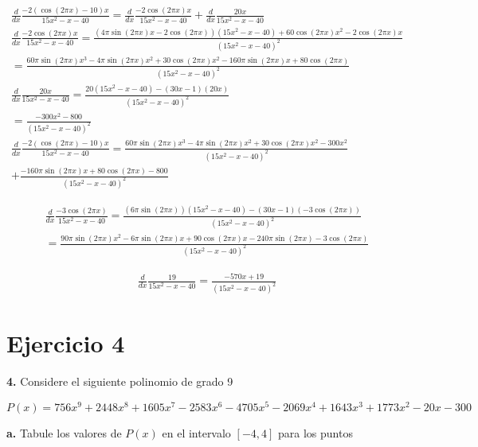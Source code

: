 \documentclass{article} %
\begin{document}
\begin{gather*}
    \frac{d}{dx} \frac{-2(\cos{(2\pi x)}-10)x}{15x^2-x-40} = \frac{d}{dx} \frac{-2\cos{(2\pi x)}x}{15x^2-x-40} + \frac{d}{dx} \frac{20x}{15x^2-x-40}\\
    \frac{d}{dx} \frac{-2\cos{(2\pi x)}x}{15x^2-x-40} = \frac{(4\pi \sin{(2\pi x)}x-2\cos{(2\pi x)})(15x^2 -x-40)+60\cos{(2\pi x)}x^2-2\cos{(2\pi x)}x}{(15x^2-x-40)^2}\\
    = \frac{60\pi\sin{(2\pi x)}x^3 - 4\pi\sin{(2\pi x)}x^2 +30\cos{(2\pi x)}x^2 -160\pi\sin{(2\pi x)}x +80\cos{(2\pi x)}}{(15x^2-x-40)^2}\\
    \frac{d}{dx} \frac{20x}{15x^2-x-40} = \frac{20(15x^2 -x-40)-(30x-1)(20x)}{(15x^2-x-40)^2}\\
    = \frac{-300x^2 -800}{(15x^2-x-40)^2}\\
    \frac{d}{dx} \frac{-2(\cos{(2\pi x)}-10)x}{15x^2-x-40} = \frac{60\pi\sin{(2\pi x)}x^3 - 4\pi\sin{(2\pi x)}x^2 +30\cos{(2\pi x)}x^2 -300x^2}{(15x^2-x-40)^2}\\
     + \frac{-160\pi\sin{(2\pi x)}x +80\cos{(2\pi x)} -800}{(15x^2-x-40)^2}
\end{gather*}

\begin{gather*}
    \frac{d}{dx} \frac{-3\cos{(2\pi x)}}{15x^2-x-40} = \frac{(6\pi\sin{(2\pi x)})(15x^2-x-40)-(30x-1)(-3\cos{(2\pi x)})}{(15x^2-x-40)^2}\\
    = \frac{90\pi\sin{(2\pi x)}x^2 -6\pi\sin{(2\pi x)}x + 90\cos{(2\pi x)}x - 240\pi\sin{(2\pi x)} -3\cos{(2\pi x)}}{(15x^2-x-40)^2}
\end{gather*}

\begin{gather*}
    \frac{d}{dx} \frac{19}{15x^2-x-40}=\frac{-570x+19}{(15x^2-x-40)^2}
\end{gather*}



\newpage
\section*{Ejercicio 4}
\textbf{4.} Considere el siguiente polinomio de grado 9

\begin{equation*}
    P(x) = 756x^9 + 2448x^8 + 1605x^7 -2583x^6 -4705x^5 -2069x^4 +1643x^3 +1773x^2 -20x -300
\end{equation*}

\textbf{a.} Tabule los valores de $P(x)$ en el intervalo $[-4,4]$ para los puntos
\end{document}
